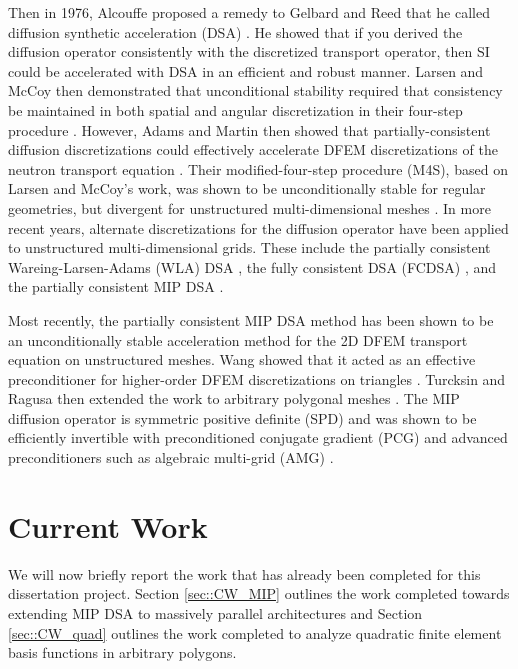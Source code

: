 \documentclass[11pt]{article}
\begin{document}
Then in 1976, Alcouffe proposed a remedy to Gelbard and Reed that he called diffusion synthetic acceleration (DSA) \cite{alcouffe1976stable,alcouffe1977DSA,alcouffe1977diffusion}. He showed that if you derived the diffusion operator consistently with the discretized transport operator, then SI could be accelerated with DSA in an efficient and robust manner. Larsen and McCoy then demonstrated that unconditional stability required that consistency be maintained in both spatial and angular discretization in their four-step procedure \cite{larsen1982unconditionally_I,larsen1982unconditionally_II}. However, Adams and Martin then showed that partially-consistent diffusion discretizations could effectively accelerate DFEM discretizations of the neutron transport equation \cite{ref::dsa_DFEM_adams_martin}. Their modified-four-step procedure (M4S), based on Larsen and McCoy's work, was shown to be unconditionally stable for regular geometries, but divergent for unstructured multi-dimensional meshes \cite{warsa2002fully}. In more recent years, alternate discretizations for the diffusion operator have been applied to unstructured multi-dimensional grids. These include the partially consistent Wareing-Larsen-Adams (WLA) DSA \cite{ref::WLA_DSA}, the fully consistent DSA (FCDSA) \cite{warsa2002fully}, and the partially consistent MIP DSA \cite{ref::DSA_wang_ragusa,wang2009adaptive,turcksin2014discontinuous}.

Most recently, the partially consistent MIP DSA method has been shown to be an unconditionally stable acceleration method for the 2D DFEM transport equation on unstructured meshes. Wang showed that it acted as an effective preconditioner for higher-order DFEM discretizations on triangles \cite{ref::DSA_wang_ragusa,wang2009adaptive}. Turcksin and Ragusa then extended the work to arbitrary polygonal meshes \cite{turcksin2014discontinuous}. The MIP diffusion operator is symmetric positive definite (SPD) and was shown to be efficiently invertible with preconditioned conjugate gradient (PCG) and advanced preconditioners such as algebraic multi-grid (AMG) \cite{turcksin2014discontinuous}.

\section{Current Work}
\label{sec::Current_Work}

We will now briefly report the work that has already been completed for this dissertation project. Section \ref{sec::CW_MIP} outlines the work completed towards extending MIP DSA to massively parallel architectures and Section \ref{sec::CW_quad} outlines the work completed to analyze quadratic finite element basis functions in arbitrary polygons.
\end{document}
